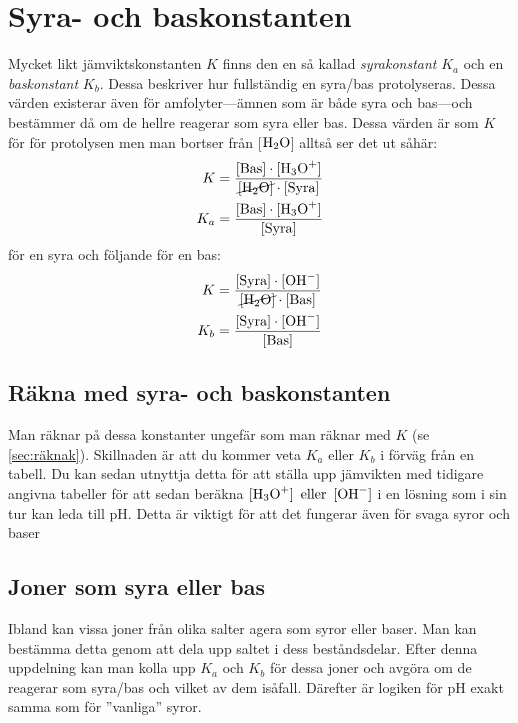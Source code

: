 \section{Syra- och baskonstanten}
Mycket likt jämviktskonstanten $K$ finns den en så kallad \emph{syrakonstant} $K_a$ och en \emph{baskonstant} $K_b$. Dessa beskriver hur fullständig en syra/bas protolyseras. Dessa värden existerar även för amfolyter---ämnen som är både syra och bas---och bestämmer då om de hellre reagerar som syra eller bas. Dessa värden är som $K$ för för protolysen men man bortser från [$\ce{H2O}$] alltså ser det ut såhär:
\begin{align*}
    K &= \frac{\mathrm{[Bas]} \cdot [\ce{H3O+}]}{\cancel{\ce{[H2O]}} \cdot \mathrm{[Syra]}} \\
    K_a &= \frac{\mathrm{[Bas]} \cdot [\ce{H3O+}]}{\mathrm{[Syra]}} 
\end{align*}
för en syra och följande för en bas:\begin{align*}
    K &= \frac{\mathrm{[Syra]} \cdot [\ce{OH^-}]}{\cancel{\ce{[H2O]}} \cdot \mathrm{[Bas]}} \\
    K_b&= \frac{\mathrm{[Syra]} \cdot [\ce{OH^-}]}{\mathrm{[Bas]}} 
\end{align*}

\subsection{Räkna med syra- och baskonstanten}
Man räknar på dessa konstanter ungefär som man räknar med $K$ (se \vref{sec:räknak}). Skillnaden är att du kommer veta $K_a \text{ eller } K_b$ i förväg från en tabell. Du kan sedan utnyttja detta för att ställa upp jämvikten med tidigare angivna tabeller för att sedan beräkna $\ce{[H3O+] \text{ eller } [OH^-]}$ i en lösning som i sin tur kan leda till pH. Detta är viktigt för att det fungerar även för svaga syror och baser

\subsection{Joner som syra eller bas}
Ibland kan vissa joner från olika salter agera som syror eller baser. Man kan bestämma detta genom att dela upp saltet i dess beståndsdelar. Efter denna uppdelning kan man kolla upp $K_a$ och $K_b$ för dessa joner och avgöra om de reagerar som syra/bas och vilket av dem isåfall. Därefter är logiken för pH exakt samma som för ''vanliga'' syror.

